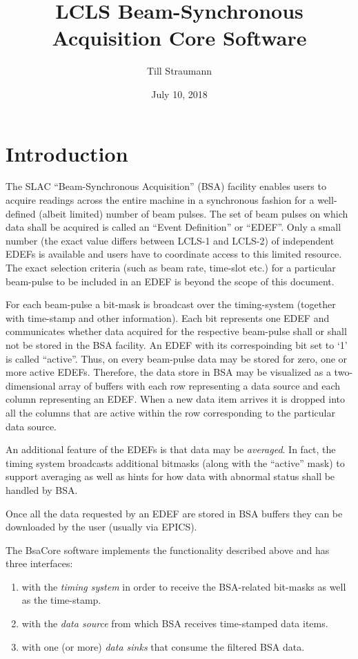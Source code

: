 \documentclass[11pt]{article}
\title{LCLS Beam-Synchronous Acquisition Core Software}
\author{Till Straumann}
\date{July 10, 2018}
\newcommand{\bsac}{BsaCore}
\newcommand{\bsa} {BSA}
\newcommand{\slac}{SLAC}
\newcommand{\EDEF}{EDEF}
\begin{document}
\maketitle
\section{Introduction}
The \slac{} ``Beam-Synchronous Acquisition'' (\bsa) facility enables users to acquire
readings across the entire machine in a synchronous fashion for a well-defined (albeit
limited) number of beam pulses. The set of beam pulses on which data shall be acquired
is called an ``Event Definition'' or ``{\EDEF}''. Only a small number (the exact value differs
between LCLS-1 and LCLS-2) of independent \EDEF{}s is available and users have to
coordinate access to this limited resource. The exact selection criteria (such as
beam rate, time-slot etc.) for a particular beam-pulse to be included in an \EDEF{} is beyond
the scope of this document.

For each beam-pulse a bit-mask is broadcast over the timing-system (together with time-stamp
and other information). Each bit represents one \EDEF{} and communicates whether data acquired
for the respective beam-pulse shall or shall not be stored in the \bsa{} facility. An \EDEF{} 
with its correspoinding bit set to `1' is called ``active''. Thus,
on every beam-pulse data may be stored for zero, one or more active \EDEF{}s. Therefore, the data
store in \bsa{} may be visualized as a two-dimensional array of buffers with each row
representing a data source and each column representing an \EDEF. When a new data item
arrives it is dropped into all the columns that are active within the row corresponding
to the particular data source.

An additional feature of the \EDEF{}s is that data may be {\em averaged}. In fact, the 
timing system broadcasts additional bitmasks (along with the ``active'' mask) to support
averaging as well as hints for how data with abnormal status shall be handled by \bsa.

Once all the data requested by an \EDEF{} are stored in \bsa{} buffers they can be downloaded
by the user (usually via EPICS).

The \bsac{} software implements the functionality described above and has three
interfaces:
\begin{enumerate}
\item with the {\em timing system} in order to receive the \bsa-related bit-masks as well as
      the time-stamp.
\item with the {\em data source} from which \bsa{} receives time-stamped data items.
\item with one (or more) {\em data sinks} that consume the filtered \bsa{} data.
\end{enumerate}
\end{document}
